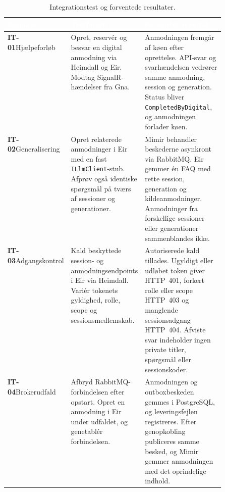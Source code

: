 \begin{table}[H]
    \centering
    \caption{Integrationstest og forventede resultater.}
    \label{tab:integrationstest}
    \small
    \renewcommand{\arraystretch}{1.2}
    \setlength{\tabcolsep}{6pt}
    \begin{tabularx}{\linewidth}{|
        >{\raggedright\arraybackslash}p{0.16\linewidth}|
        >{\raggedright\arraybackslash}p{0.34\linewidth}|
        >{\raggedright\arraybackslash}X|}
        \hline
        \rowcolor{aucyan}
        \textcolor{white}{\textbf{Scenarie}} &
        \textcolor{white}{\textbf{Testforløb}} &
        \textcolor{white}{\textbf{Forventet resultat}} \\ \hline

        \textbf{IT-01}\newline Hjælpeforløb &
        Opret, reservér og besvar en digital anmodning via Heimdall og Eir.
        Modtag SignalR-hændelser fra Gna. &
        Anmodningen fremgår af køen efter oprettelse. API-svar og
        svarhændelsen vedrører samme anmodning, session og generation.
        Status bliver \texttt{CompletedByDigital}, og anmodningen forlader køen.
        \\ \hline

        \textbf{IT-02}\newline Generalisering &
        Opret relaterede anmodninger i Eir med en fast
        \texttt{ILlmClient}-stub. Afprøv også identiske spørgsmål på tværs
        af sessioner og generationer. &
        Mimir behandler beskederne asynkront via RabbitMQ. Eir gemmer én FAQ
        med rette session, generation og kildeanmodninger. Anmodninger fra
        forskellige sessioner eller generationer sammenblandes ikke.
        \\ \hline

        \textbf{IT-03}\newline Adgangskontrol &
        Kald beskyttede session- og anmodningsendpoints i Eir via Heimdall.
        Variér tokenets gyldighed, rolle, scope og sessionsmedlemskab. &
        Autoriserede kald tillades. Ugyldigt eller udløbet token giver
        HTTP~401, forkert rolle eller scope HTTP~403 og manglende
        sessionsadgang HTTP~404. Afviste svar indeholder ingen private
        titler, spørgsmål eller sessionskoder.
        \\ \hline

        \textbf{IT-04}\newline Brokerudfald &
        Afbryd RabbitMQ-forbindelsen efter opstart. Opret en anmodning i
        Eir under udfaldet, og genetablér forbindelsen. &
        Anmodningen og outboxbeskeden gemmes i PostgreSQL, og leveringsfejlen
        registreres. Efter genopkobling publiceres samme besked, og Mimir
        gemmer anmodningen med det oprindelige indhold.
        \\ \hline


\end{tabularx}
\end{table}

